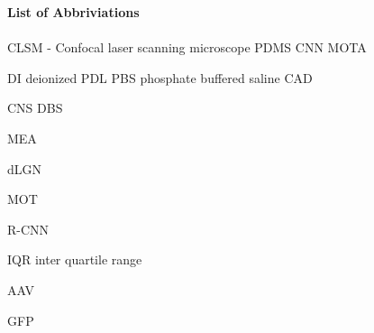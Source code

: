 \Large{\textbf{List of Abbriviations}} \\ \\

\normalsize
CLSM  -  Confocal laser scanning microscope
PDMS
CNN
MOTA

DI deionized
PDL
PBS phosphate buffered saline
CAD

CNS
DBS

MEA

dLGN

MOT

R-CNN

IQR inter quartile range

AAV

GFP